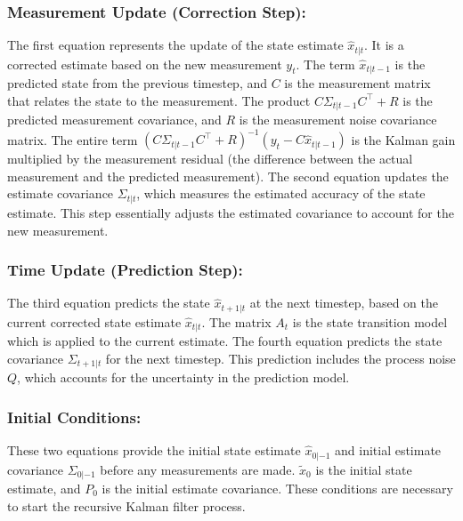 \documentclass{article}
\begin{document}
  \subsubsection*{Measurement Update (Correction Step):}
  The first equation represents the update of the state estimate $\hat{x}_{t|t}$. It is a corrected estimate based on the new measurement 
  $y_t$. The term $\hat{x}_{t|t-1}$ is the predicted state from the previous timestep, and $C$ is the measurement matrix that relates the state 
  to the measurement. The product $C\Sigma_{t|t-1}C^\intercal + R$ is the predicted measurement covariance, and $R$ is the measurement noise 
  covariance matrix. The entire term $(C\Sigma_{t|t-1}C^\intercal + R)^{-1}(y_t - C\hat{x}_{t|t-1})$ is the Kalman gain multiplied by the measurement 
  residual (the difference between the actual measurement and the predicted measurement). The second equation updates the estimate covariance $\Sigma_{t|t}$,
   which measures the estimated accuracy of the state estimate. This step essentially adjusts the estimated covariance to account for the new measurement.

  \subsubsection*{Time Update (Prediction Step):}
  The third equation predicts the state $\hat{x}_{t+1|t}$ at the next timestep, based on the current corrected state estimate $\hat{x}_{t|t}$. The matrix
   $A_t$ is the state transition model which is applied to the current estimate. The fourth equation predicts the state covariance $\Sigma_{t+1|t}$ for the 
   next timestep. This prediction includes the process noise $Q$, which accounts for the uncertainty in the prediction model.

  \subsubsection*{Initial Conditions:}
  These two equations provide the initial state estimate $\hat{x}_{0|-1}$ and initial estimate covariance $\Sigma_{0|-1}$ before any measurements are made. 
  $\tilde{x}_0$ is the initial state estimate, and $P_0$ is the initial estimate covariance. These conditions are necessary to start the recursive Kalman filter process.
\end{document}
